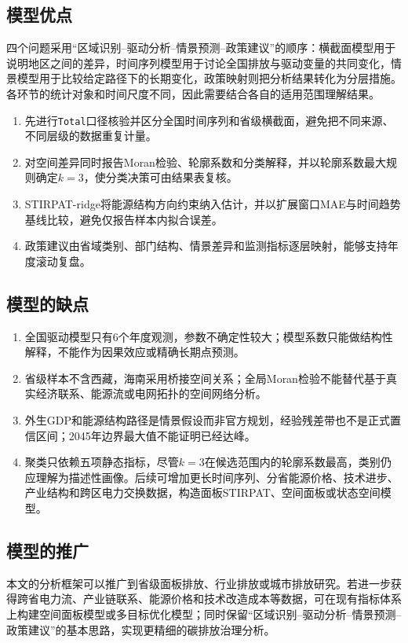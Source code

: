 \documentclass[12pt,a4paper]{ctexart}
\theoremstyle{definition}
\theoremstyle{plain}
\theoremstyle{remark}
\begin{document}
\subsection{模型优点}
四个问题采用“区域识别--驱动分析--情景预测--政策建议”的顺序：横截面模型用于说明地区之间的差异，时间序列模型用于讨论全国排放与驱动变量的共同变化，情景模型用于比较给定路径下的长期变化，政策映射则把分析结果转化为分层措施。各环节的统计对象和时间尺度不同，因此需要结合各自的适用范围理解结果。
\begin{enumerate}[label=(\arabic*)]
\item 先进行\texttt{Total}口径核验并区分全国时间序列和省级横截面，避免把不同来源、不同层级的数据重复计量。
\item 对空间差异同时报告Moran检验、轮廓系数和分类解释，并以轮廓系数最大规则确定$k=3$，使分类决策可由结果表复核。
\item STIRPAT-ridge将能源结构方向约束纳入估计，并以扩展窗口MAE与时间趋势基线比较，避免仅报告样本内拟合误差。
\item 政策建议由省域类别、部门结构、情景差异和监测指标逐层映射，能够支持年度滚动复盘。
\end{enumerate}

\subsection{模型的缺点}
\begin{enumerate}[label=(\arabic*)]
\item 全国驱动模型只有6个年度观测，参数不确定性较大；模型系数只能做结构性解释，不能作为因果效应或精确长期点预测。
\item 省级样本不含西藏，海南采用桥接空间关系；全局Moran检验不能替代基于真实经济联系、能源流或电网拓扑的空间网络分析。
\item 外生GDP和能源结构路径是情景假设而非官方规划，经验残差带也不是正式置信区间；2045年边界最大值不能证明已经达峰。
\item 聚类只依赖五项静态指标，尽管$k=3$在候选范围内的轮廓系数最高，类别仍应理解为描述性画像。后续可增加更长时间序列、分省能源价格、技术进步、产业结构和跨区电力交换数据，构造面板STIRPAT、空间面板或状态空间模型。
\end{enumerate}

\subsection{模型的推广}
本文的分析框架可以推广到省级面板排放、行业排放或城市排放研究。若进一步获得跨省电力流、产业链联系、能源价格和技术改造成本等数据，可在现有指标体系上构建空间面板模型或多目标优化模型；同时保留“区域识别--驱动分析--情景预测--政策建议”的基本思路，实现更精细的碳排放治理分析。
\end{document}
